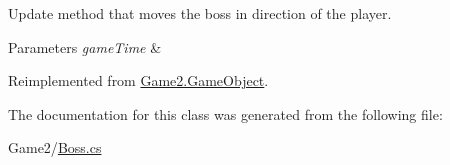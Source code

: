 Update method that moves the boss in direction of the player. 


\begin{DoxyParams}{Parameters}
{\em game\+Time} & \\
\hline
\end{DoxyParams}


Reimplemented from \mbox{\hyperlink{class_game2_1_1_game_object_a360a294d8a55dcc747c44f8cc1aefe28}{Game2.\+Game\+Object}}.



The documentation for this class was generated from the following file\+:\begin{DoxyCompactItemize}
\item 
Game2/\mbox{\hyperlink{_boss_8cs}{Boss.\+cs}}\end{DoxyCompactItemize}
